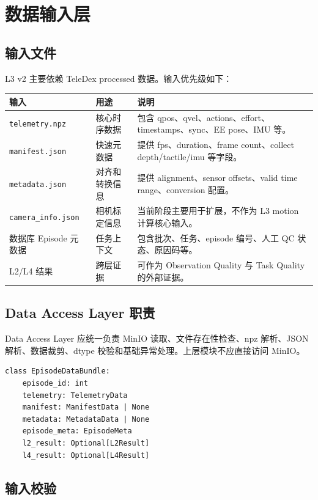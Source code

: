 \documentclass[UTF8,zihao=-4]{ctexart}
\newcommand{\Code}[1]{\texttt{#1}}
\begin{document}
\section{数据输入层}

\subsection{输入文件}

L3 v2 主要依赖 TeleDex processed 数据。输入优先级如下：

\begin{longtable}{L{4cm} L{4cm} L{6cm}}
\toprule
输入 & 用途 & 说明 \\
\midrule
\Code{telemetry.npz} & 核心时序数据 & 包含 qpos、qvel、actions、effort、timestamps、sync、EE pose、IMU 等。 \\
\Code{manifest.json} & 快速元数据 & 提供 fps、duration、frame count、collect depth/tactile/imu 等字段。 \\
\Code{metadata.json} & 对齐和转换信息 & 提供 alignment、sensor offsets、valid time range、conversion 配置。 \\
\Code{camera\_info.json} & 相机标定信息 & 当前阶段主要用于扩展，不作为 L3 motion 计算核心输入。 \\
数据库 Episode 元数据 & 任务上下文 & 包含批次、任务、episode 编号、人工 QC 状态、原因码等。 \\
L2/L4 结果 & 跨层证据 & 可作为 Observation Quality 与 Task Quality 的外部证据。 \\
\bottomrule
\end{longtable}

\subsection{Data Access Layer 职责}

Data Access Layer 应统一负责 MinIO 读取、文件存在性检查、npz 解析、JSON 解析、数据裁剪、dtype 校验和基础异常处理。上层模块不应直接访问 MinIO。

\begin{verbatim}
class EpisodeDataBundle:
    episode_id: int
    telemetry: TelemetryData
    manifest: ManifestData | None
    metadata: MetadataData | None
    episode_meta: EpisodeMeta
    l2_result: Optional[L2Result]
    l4_result: Optional[L4Result]
\end{verbatim}

\subsection{输入校验}
\end{document}
